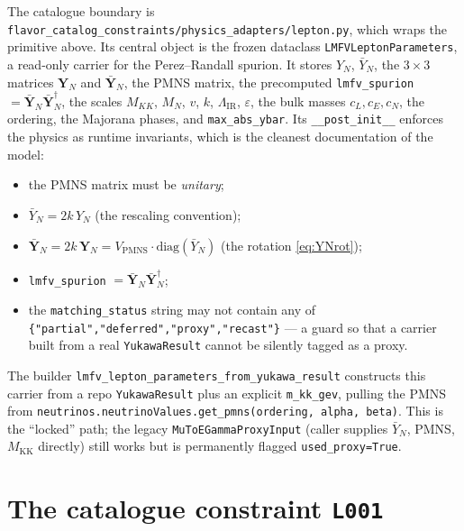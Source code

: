 \documentclass[11pt]{article}
\newcommand{\MKK}{M_{\mathrm{KK}}}
\newcommand{\LIR}{\Lambda_{\mathrm{IR}}}
\newcommand{\eps}{\varepsilon}
\newcommand{\YN}{Y_N}
\newcommand{\YNb}{\bar Y_N}
\newcommand{\YNmat}{\mathbf{Y}_N}
\newcommand{\YNbmat}{\bar{\mathbf{Y}}_N}
\newcommand{\Vpmns}{V_{\mathrm{PMNS}}}
\newcommand{\code}[1]{\texttt{#1}}
\theoremstyle{definition}
\begin{document}
The catalogue boundary is
\code{flavor\_catalog\_constraints/physics\_adapters/lepton.py}, which wraps the
primitive above. Its central object is the frozen dataclass
\code{LMFVLeptonParameters}, a read-only carrier for the Perez--Randall spurion.
It stores $\YN$, $\YNb$, the $3\times3$ matrices $\YNmat$ and
$\YNbmat$, the PMNS matrix, the precomputed \code{lmfv\_spurion}
$=\YNbmat\YNbmat^\dagger$, the scales $M_{KK}$, $M_N$, $v$,
$k$, $\LIR$, $\eps$, the bulk masses $c_L,c_E,c_N$, the ordering, the Majorana
phases, and \code{max\_abs\_ybar}. Its \code{\_\_post\_init\_\_} enforces the
physics as runtime invariants, which is the cleanest documentation of the model:
\begin{itemize}[leftmargin=1.4em]
\item the PMNS matrix must be \emph{unitary};
\item $\YNb = 2k\,\YN$ (the rescaling convention);
\item $\YNbmat = 2k\,\YNmat = \Vpmns\cdot\mathrm{diag}(\YNb)$
(the rotation \eqref{eq:YNrot});
\item \code{lmfv\_spurion} $= \YNbmat\YNbmat^\dagger$;
\item the \code{matching\_status} string may not contain any of
\code{\{"partial","deferred","proxy","recast"\}} --- a guard so that a carrier
built from a real \code{YukawaResult} cannot be silently tagged as a proxy.
\end{itemize}
The builder \code{lmfv\_lepton\_parameters\_from\_yukawa\_result} constructs this
carrier from a repo \code{YukawaResult} plus an explicit \code{m\_kk\_gev}, pulling
the PMNS from \code{neutrinos.neutrinoValues.get\_pmns(ordering, alpha, beta)}.
This is the ``locked'' path; the legacy \code{MuToEGammaProxyInput} (caller
supplies $\YNb$, PMNS, $\MKK$ directly) still works but is permanently flagged
\code{used\_proxy=True}.

\section{The catalogue constraint \code{L001}}
\label{sec:codeL001}
\end{document}
